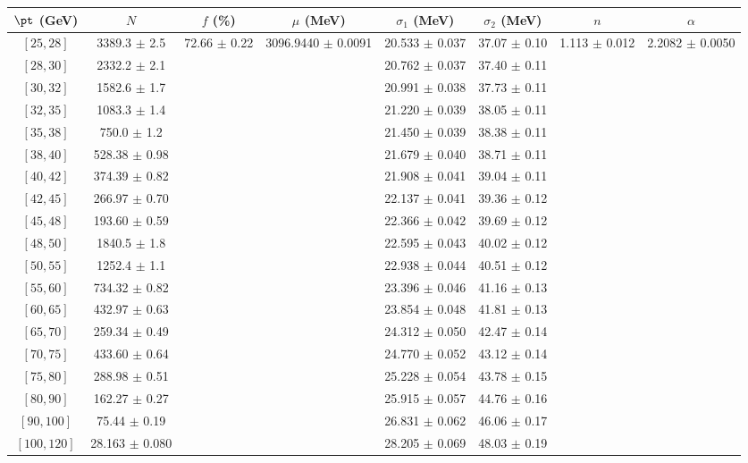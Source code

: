 \begin{tabular}{c||c|c|c|c|c|c|c}
$\pt$ (GeV) & $N$ & $f$ (\%) & $\mu$ (MeV) & $\sigma_1$ (MeV) & $\sigma_2$ (MeV) & $n$ & $\alpha$ \\
\hline
$[25, 28]$ & 3389.3 $\pm$ 2.5 & \multirow{19}{*}{72.66 $\pm$ 0.22} & \multirow{19}{*}{3096.9440 $\pm$ 0.0091} & 20.533 $\pm$ 0.037 & 37.07 $\pm$ 0.10 & \multirow{19}{*}{1.113 $\pm$ 0.012} & \multirow{19}{*}{2.2082 $\pm$ 0.0050}\\
$[28, 30]$ & 2332.2 $\pm$ 2.1 &  &  & 20.762 $\pm$ 0.037 & 37.40 $\pm$ 0.11 &  & \\
$[30, 32]$ & 1582.6 $\pm$ 1.7 &  &  & 20.991 $\pm$ 0.038 & 37.73 $\pm$ 0.11 &  & \\
$[32, 35]$ & 1083.3 $\pm$ 1.4 &  &  & 21.220 $\pm$ 0.039 & 38.05 $\pm$ 0.11 &  & \\
$[35, 38]$ & 750.0 $\pm$ 1.2 &  &  & 21.450 $\pm$ 0.039 & 38.38 $\pm$ 0.11 &  & \\
$[38, 40]$ & 528.38 $\pm$ 0.98 &  &  & 21.679 $\pm$ 0.040 & 38.71 $\pm$ 0.11 &  & \\
$[40, 42]$ & 374.39 $\pm$ 0.82 &  &  & 21.908 $\pm$ 0.041 & 39.04 $\pm$ 0.11 &  & \\
$[42, 45]$ & 266.97 $\pm$ 0.70 &  &  & 22.137 $\pm$ 0.041 & 39.36 $\pm$ 0.12 &  & \\
$[45, 48]$ & 193.60 $\pm$ 0.59 &  &  & 22.366 $\pm$ 0.042 & 39.69 $\pm$ 0.12 &  & \\
$[48, 50]$ & 1840.5 $\pm$ 1.8 &  &  & 22.595 $\pm$ 0.043 & 40.02 $\pm$ 0.12 &  & \\
$[50, 55]$ & 1252.4 $\pm$ 1.1 &  &  & 22.938 $\pm$ 0.044 & 40.51 $\pm$ 0.12 &  & \\
$[55, 60]$ & 734.32 $\pm$ 0.82 &  &  & 23.396 $\pm$ 0.046 & 41.16 $\pm$ 0.13 &  & \\
$[60, 65]$ & 432.97 $\pm$ 0.63 &  &  & 23.854 $\pm$ 0.048 & 41.81 $\pm$ 0.13 &  & \\
$[65, 70]$ & 259.34 $\pm$ 0.49 &  &  & 24.312 $\pm$ 0.050 & 42.47 $\pm$ 0.14 &  & \\
$[70, 75]$ & 433.60 $\pm$ 0.64 &  &  & 24.770 $\pm$ 0.052 & 43.12 $\pm$ 0.14 &  & \\
$[75, 80]$ & 288.98 $\pm$ 0.51 &  &  & 25.228 $\pm$ 0.054 & 43.78 $\pm$ 0.15 &  & \\
$[80, 90]$ & 162.27 $\pm$ 0.27 &  &  & 25.915 $\pm$ 0.057 & 44.76 $\pm$ 0.16 &  & \\
$[90, 100]$ & 75.44 $\pm$ 0.19 &  &  & 26.831 $\pm$ 0.062 & 46.06 $\pm$ 0.17 &  & \\
$[100, 120]$ & 28.163 $\pm$ 0.080 &  &  & 28.205 $\pm$ 0.069 & 48.03 $\pm$ 0.19 &  & \\
\end{tabular}
